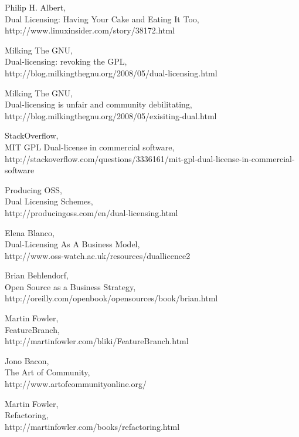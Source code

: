 \documentclass[11pt]{scrartcl}
\begin{document}
\begin{thebibliography}{9}

    Philip H. Albert,\\
    Dual Licensing: Having Your Cake and Eating It Too,\\
    http://www.linuxinsider.com/story/38172.html

    Milking The GNU,\\
    Dual-licensing: revoking the GPL,\\
    http://blog.milkingthegnu.org/2008/05/dual-licensing.html

    Milking The GNU,\\
    Dual-licensing is unfair and community debilitating,\\
    http://blog.milkingthegnu.org/2008/05/exisiting-dual.html

    StackOverflow,\\
    MIT GPL Dual-license in commercial software,\\
    http://stackoverflow.com/questions/3336161/mit-gpl-dual-license-in-commercial-software

    Producing OSS,\\
    Dual Licensing Schemes,\\
    http://producingoss.com/en/dual-licensing.html

    Elena Blanco,\\
    Dual-Licensing As A Business Model,\\
    http://www.oss-watch.ac.uk/resources/duallicence2

    Brian Behlendorf,\\
    Open Source as a Business Strategy,\\
    http://oreilly.com/openbook/opensources/book/brian.html
    
    Martin Fowler,\\
    FeatureBranch,\\
    http://martinfowler.com/bliki/FeatureBranch.html
    
    Jono Bacon,\\
    The Art of Community,\\
    http://www.artofcommunityonline.org/
    
    Martin Fowler,\\
    Refactoring,\\
    http://martinfowler.com/books/refactoring.html


\end{thebibliography}
\end{document}
